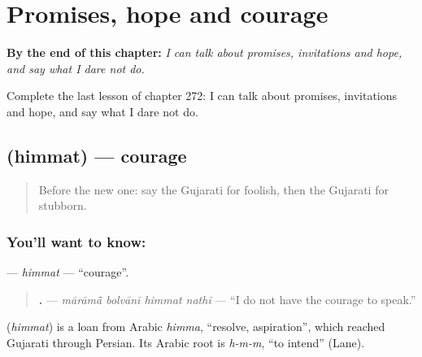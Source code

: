 
\chapter{Promises, hope and courage}
\label{ch:gu-promises-hope-and-courage}

\begin{chapteropening}
\textbf{By the end of this chapter:} \emph{I can talk about promises, invitations and hope, and say what I dare not do.}

Complete the last lesson of chapter 272: I can talk about promises, invitations and hope, and say what I dare not do.
\end{chapteropening}

\section[\texorpdfstring{\gu{હિંમત} (himmat)}{હિંમત (himmat)}]{ (himmat) — courage}

\label{lesson:GU-C272-himmat}



\begin{quote}
Before the new one: say the Gujarati for foolish, then the Gujarati for stubborn.
\end{quote}

\subsection*{You'll want to know: }
\textbf{} — \emph{himmat} — \textquotedblleft{}courage\textquotedblright{}.

\begin{quote}
\textbf{   .} — \emph{mārāmā̃ bolvānī himmat nathī} — \textquotedblleft{}I do not have the courage to speak.\textquotedblright{}
\end{quote}

\begin{cousinweb}
\textbf{} (\emph{himmat}) is a loan from Arabic \emph{himma}, \textquotedblleft{}resolve, aspiration\textquotedblright{}, which reached Gujarati through Persian. Its Arabic root is \emph{h-m-m}, \textquotedblleft{}to intend\textquotedblright{} (Lane).
\end{cousinweb}

